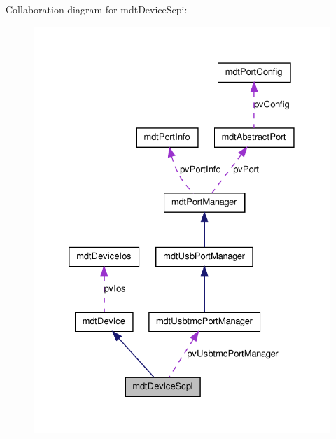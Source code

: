 Collaboration diagram for mdtDeviceScpi:\nopagebreak
\begin{figure}[H]
\begin{center}
\leavevmode
\includegraphics[width=328pt]{classmdt_device_scpi__coll__graph}
\end{center}
\end{figure}
